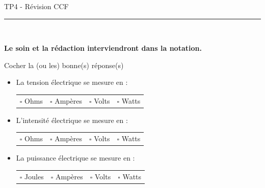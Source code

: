 \documentclass[11pt,a4paper]{article}
\begin{document}
\begin{center}
 \LARGE{TP4 - Révision CCF}
\end{center}

\vspace{3 mm}

\normalsize

\hrule\
\\[0,2cm]
   \begin{center}
   \textbf{Le soin et la rédaction interviendront dans la notation.}
   \end{center} 

 Cocher la (ou les) bonne(s) réponse(s) \\

\begin{itemize}
    \item La tension électrique se mesure en : \\
    \vspace{-5mm} 
        \begin{center}
    \begin{tabular}{C{3cm} C{3cm} C{3cm} C{3cm}}
         $\square$ Ohms & $\square$ Ampères & $\square$ Volts & $\square$ Watts \\
    \end{tabular}
\end{center}

\item L’intensité électrique se mesure en  :\\
\vspace{-5mm} 
        \begin{center}
    \begin{tabular}{C{3cm} C{3cm} C{3cm} C{3cm}}
         $\square$ Ohms & $\square$ Ampères & $\square$ Volts & $\square$ Watts \\
    \end{tabular}
\end{center}


\item La puissance électrique se mesure en : \\
\vspace{-5mm} 
\begin{center}
    \begin{tabular}{C{3cm} C{3cm} C{3cm} C{3cm}}
         $\square$ Joules & $\square$ Ampères & $\square$ Volts & $\square$ Watts \\
    \end{tabular}
\end{center}


\end{itemize}
\end{document}
